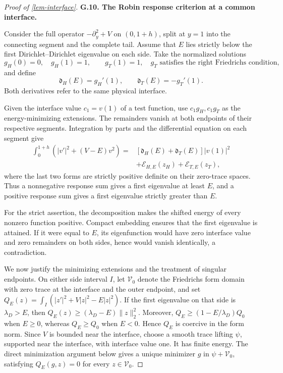 \documentclass[11pt,a4paper]{article}
\theoremstyle{proofmanuscript}
\begin{document}
\begin{proof}[Proof of \ref{lem-interface}]

\textbf{G.10. The Robin response criterion at a common interface.}

Consider the full operator \(-\partial_y^2+V\) on \((0,1+h)\), split at \(y=1\) into the connecting segment and the complete tail. Assume that \(E\) lies strictly below the first Dirichlet--Dirichlet eigenvalue on each side. Take the normalized solutions \[
g_H(0)=0,\quad g_H(1)=1,
\qquad g_T(1)=1,\quad g_T\text{ satisfies the right Friedrichs condition},
\] and define \[
\mathfrak d_H(E)=g_H'(1),\qquad
\mathfrak d_T(E)=-g_T'(1).
\tag{G.10.1}
\] Both derivatives refer to the same physical interface.

Given the interface value \(c_1=v(1)\) of a test function, use \(c_1g_H,c_1g_T\) as the energy-minimizing extensions. The remainders vanish at both endpoints of their respective segments. Integration by parts and the differential equation on each segment give \[
\begin{aligned}
\int_0^{1+h}(|v'|^2+(V-E)v^2)
={}&[\mathfrak d_H(E)+\mathfrak d_T(E)]|v(1)|^2\\
&+\mathcal E_{H,E}(z_H)+\mathcal E_{T,E}(z_T),
\end{aligned}
\tag{G.10.2}
\] where the last two forms are strictly positive definite on their zero-trace spaces. Thus a nonnegative response sum gives a first eigenvalue at least \(E\), and a positive response sum gives a first eigenvalue strictly greater than \(E\).

For the strict assertion, the decomposition makes the shifted energy of every nonzero function positive. Compact embedding ensures that the first eigenvalue is attained. If it were equal to \(E\), its eigenfunction would have zero interface value and zero remainders on both sides, hence would vanish identically, a contradiction.

We now justify the minimizing extensions and the treatment of singular endpoints. On either side interval \(I\), let \(\mathcal V_0\) denote the Friedrichs form domain with zero trace at the interface and the outer endpoint, and set \(Q_E(z)=\int_I(|z'|^2+V|z|^2-E|z|^2)\). If the first eigenvalue on that side is \(\lambda_D>E\), then \(Q_E(z)\ge(\lambda_D-E)\|z\|_2^2\). Moreover, \(Q_E\ge(1-E/\lambda_D)Q_0\) when \(E\ge0\), whereas \(Q_E\ge Q_0\) when \(E<0\). Hence \(Q_E\) is coercive in the form norm. Since \(V\) is bounded near the interface, choose a smooth trace lifting \(\psi\), supported near the interface, with interface value one. It has finite energy. The direct minimization argument below gives a unique minimizer \(g\) in \(\psi+\mathcal V_0\), satisfying \(Q_E(g,z)=0\) for every \(z\in\mathcal V_0\).


\end{proof}
\end{document}
